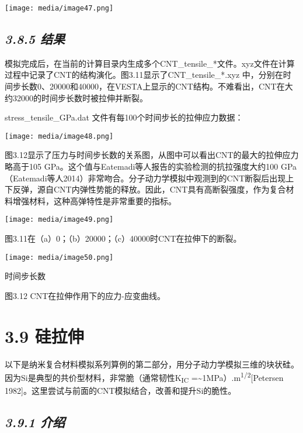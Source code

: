 \documentclass[
]{article}
\begin{document}
\texttt{[image: media/image47.png]}

\hypertarget{ux7ed3ux679c-7}{%
\subsection{\texorpdfstring{\emph{3.8.5
结果}}{3.8.5 结果}}\label{ux7ed3ux679c-7}}

模拟完成后，在当前的计算目录内生成多个CNT\_tensile\_*文件。xyz文件在计算过程中记录了CNT的结构演化。图3.11显示了CNT\_tensile\_*.xyz
中，分别在时间步长数0、20000和40000，在VESTA上显示的CNT结构。不难看出，CNT在大约32000的时间步长数时被拉伸并断裂。

stress\_tensile\_GPa.dat 文件有每100个时间步长的拉伸应力数据：

\texttt{[image: media/image48.png]}

图3.12显示了压力与时间步长数的关系图，从图中可以看出CNT的最大的拉伸应力略高于105
GPa。这个值与Eatemadi等人报告的实验检测的抗拉强度大约100
GPa（Eatemadi等人2014）非常吻合。分子动力学模拟中观测到的CNT断裂后出现上下反弹，源自CNT内弹性势能的释放。因此，CNT具有高断裂强度，作为复合材料增强材料，这种高弹特性是非常重要的指标。

\texttt{[image: media/image49.png]}

图3.11在（a）0；（b）20000；（c）40000时CNT在拉伸下的断裂。

\texttt{[image: media/image50.png]}

时间步长数

图3.12 CNT在拉伸作用下的应力-应变曲线。

\hypertarget{ux7845ux62c9ux4f38}{%
\section{3.9 硅拉伸}\label{ux7845ux62c9ux4f38}}

以下是纳米复合材料模拟系列算例的第二部分，用分子动力学模拟三维的块状硅。因为Si是典型的共价型材料，非常脆（通常韧性K\textsubscript{IC}
=\textasciitilde1MPa）.m\textsuperscript{1/2}{[}Petersen
1982{]}。这里尝试与前面的CNT模拟结合，改善和提升Si的脆性。

\hypertarget{ux4ecbux7ecd}{%
\subsection{\texorpdfstring{\emph{3.9.1
介绍}}{3.9.1 介绍}}\label{ux4ecbux7ecd}}
\end{document}
